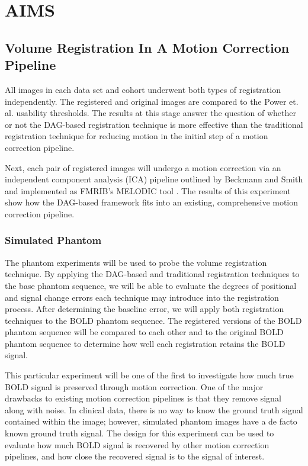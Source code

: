 \chapter{AIMS}
\label{ch:experiments}

\section{Volume Registration In A Motion Correction Pipeline}

All images in each data set and cohort underwent both types of registration independently. The registered and original images are compared to the Power et. al. usability thresholds. The results at this stage answer the question of whether or not the DAG-based registration technique is more effective than the traditional registration technique for reducing motion in the initial step of a motion correction pipeline.  

Next, each pair of registered images will undergo a motion correction via an independent component analysis (ICA) pipeline outlined by Beckmann and Smith and implemented as FMRIB's MELODIC tool \cite{Beckmann2004}. The results of this experiment show how the DAG-based framework fits into an existing, comprehensive motion correction pipeline. 

\subsection{Simulated Phantom}

The phantom experiments will be used to probe the volume registration technique. By applying the DAG-based and traditional registration techniques to the base phantom sequence, we will be able to evaluate the degrees of positional and signal change errors each technique may introduce into the registration process. After determining the baseline error, we will apply both registration techniques to the BOLD phantom sequence. The registered versions of the BOLD phantom sequence will be compared to each other and to the original BOLD phantom sequence to determine how well each registration retains the BOLD signal.

This particular experiment will be one of the first to investigate how much true BOLD signal is preserved through motion correction. One of the major drawbacks to existing motion correction pipelines is that they remove signal along with noise. In clinical data, there is no way to know the ground truth signal contained within the image; however, simulated phantom images have a de facto known ground truth signal. The design for this experiment can be used to evaluate how much BOLD signal is recovered by other motion correction pipelines, and how close the recovered signal is to the signal of interest.

